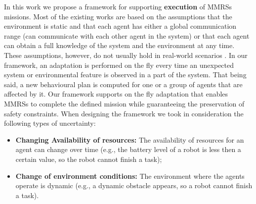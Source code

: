 \documentclass[journal]{IEEEtran}
\theoremstyle{definition}
\newcommand\patrizio[1]{\nb{Patrizio}{#1}}
\begin{document}


\patrizio{missing a figure here}
In this work we propose a framework for supporting \textbf{execution} of MMRSs missions. 
Most of the existing works are based on the assumptions that the environment is static and that each agent has either a global communication range (can communicate with each other agent in the system) or that each agent can obtain a full knowledge of the system and the environment at any time. These
assumptions, however, do not usually hold in real-world scenarios \cite{lahijanian2016iterative}.
In our framework, an adaptation is performed on the fly every time an unexpected system or environmental feature is observed in a part of the system. That being said, a new behavioural plan is computed for one or a group of agents that are affected by it. Our framework supports on the fly adaptation that enables MMRSs to complete the defined mission while guaranteeing the preservation of safety constraints.
When designing the framework we took in consideration the following types of uncertainty:
\begin{itemize}
\item \textbf{Changing Availability of resources:} The availability of resources for an agent can change over time (e.g., the battery level of a robot is less then a certain value, so the robot cannot finish a task);
\item \textbf{Change of environment conditions:} The environment where the agents operate is dynamic (e.g., a dynamic obstacle appears, so a robot cannot finish a task).
\end{itemize}
\end{document}
